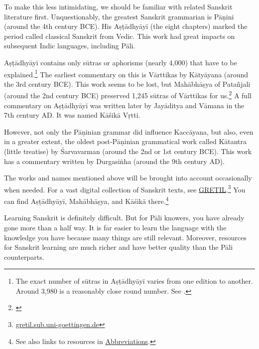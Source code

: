 To make this less intimidating, we should be familiar with related Sanskrit literature first. Unquestionably, the greatest Sanskrit grammarian is Pāṇini (around the 4th century BCE). His Aṣṭādhyāyī (the eight chapters) marked the period called classical Sanskrit from Vedic. This work had great impacts on subsequent Indic languages, including Pāli.

Aṣṭādhyāyī contains only sūtras or aphorisms (nearly 4,000) that have to be explained.\footnote{The exact number of sūtras in Aṣṭādhyāyī varies from one edition to another. Around 3,980 is a reasonably close round number. See \citealp[pp.~36--37]{deokar:terms}.} The earliest commentary on this is Vārttikas by Kātyāyana (around the 3rd century BCE). This work seems to be lost, but Mahābhāṣya of Patañjali (around the 2nd century BCE) preserved 1,245 sūtras of Vārttikas for us.\footnote{\citealp[p.~426]{keith:history}} A full commentary on Aṣṭādhyāyī was written later by Jayāditya and Vāmana in the 7th century AD. It was named Kāśikā Vṛtti.

However, not only the Pāṇinian grammar did influence Kaccāyana, but also, even in a greater extent, the oldest post-Pāṇinian grammatical work called Kātantra (little treatise) by Śarvavarman (around the 2nd or 1st century BCE). This work has a commentary written by Durgasiṅha (around the 9th century AD).

The works and names mentioned above will be brought into account occasionally when needed. For a vast digital collection of Sanskrit texts, see \href{https://gretil.sub.uni-goettingen.de/}{GRETIL}.\footnote{\url{gretil.sub.uni-goettingen.de}} You can find Aṣṭādhyāyī, Mahābhāṣya, and Kāśikā there.\footnote{See also links to resources in \hyperref[chap:abbrev]{Abbreviations}.}

Learning Sanskrit is definitely difficult. But for Pāli knowers, you have already gone more than a half way. It is far easier to learn the language with the knowledge you have because many things are still relevant. Moreover, resources for Sanskrit learning are much richer and have better quality than the Pāli counterparts.
